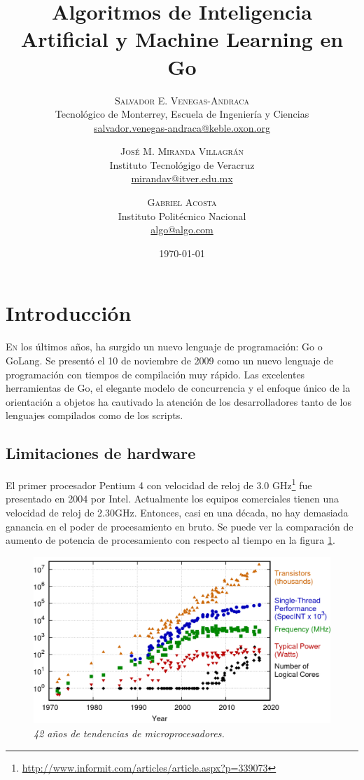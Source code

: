 \documentclass[twoside,twocolumn]{article}
\title{Algoritmos de Inteligencia Artificial y Machine Learning en Go} %
\author{%
\textsc{Salvador E. Venegas-Andraca} \\[1ex] %
\normalsize Tecnológico de Monterrey, Escuela de Ingeniería y Ciencias \\ %
\normalsize \href{mailto:salvador.venegas-andraca@keble.oxon.org}{salvador.venegas-andraca@keble.oxon.org} %
\and %
\textsc{José M. Miranda Villagrán} \\[1ex] %
\normalsize Instituto Tecnológigo de Veracruz \\ %
\normalsize \href{mailto:mirandav@itver.edu.mx}{mirandav@itver.edu.mx} %
\and %
\textsc{Gabriel Acosta} \\[1ex] %
\normalsize Instituto Politécnico Nacional \\ %
\normalsize \href{mailto:algo@algo.com}{algo@algo.com} %
}
\date{\today} %
\begin{document}
\maketitle


\section{Introducción}

\lettrine[nindent=0em,lines=3]{E} n los últimos años, ha surgido un nuevo lenguaje de programación: Go o GoLang. Se presentó el 10 de noviembre de 2009 como un nuevo lenguaje de programación con tiempos de compilación muy rápido. Las excelentes herramientas de Go, el elegante modelo de concurrencia y el enfoque único de la orientación a objetos ha cautivado la atención de los desarrolladores tanto de los lenguajes compilados como de los scripts.

\subsection{Limitaciones de hardware}

El primer procesador Pentium 4 con velocidad de reloj de 3.0 GHz\footnote{\url{ http://www.informit.com/articles/article.aspx?p=339073}} fue presentado en 2004 por Intel. Actualmente los equipos comerciales tienen una velocidad de reloj de 2.30GHz. Entonces, casi en una década, no hay demasiada ganancia en el poder de procesamiento en bruto. Se puede ver la comparación de aumento de potencia de procesamiento con respecto al tiempo en la figura \ref{fig1}.

\begin{figure}[htbp]
	\centerline{\includegraphics[scale=0.22]{img/42-years-processor-trend.png}}
	\caption{\textit{42 años de tendencias de microprocesadores.}}
	\label{fig1}
\end{figure}
\end{document}
